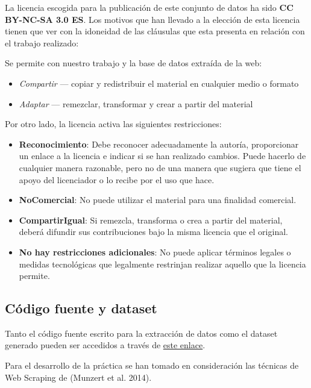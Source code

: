 \documentclass[]{article}
\providecommand{\tightlist}{%
  \setlength{\itemsep}{0pt}\setlength{\parskip}{0pt}}
\begin{document}
La licencia escogida para la publicación de este conjunto de datos ha
sido \textbf{CC BY-NC-SA 3.0 ES}. Los motivos que han llevado a la
elección de esta licencia tienen que ver con la idoneidad de las
cláusulas que esta presenta en relación con el trabajo realizado:

Se permite con nuestro trabajo y la base de datos extraída de la web:

\begin{itemize}
\tightlist
\item
  \emph{Compartir} --- copiar y redistribuir el material en cualquier
  medio o formato
\item
  \emph{Adaptar} --- remezclar, transformar y crear a partir del
  material
\end{itemize}

Por otro lado, la licencia activa las siguientes restricciones:

\begin{itemize}
\tightlist
\item
  \textbf{Reconocimiento}: Debe reconocer adecuadamente la autoría,
  proporcionar un enlace a la licencia e indicar si se han realizado
  cambios. Puede hacerlo de cualquier manera razonable, pero no de una
  manera que sugiera que tiene el apoyo del licenciador o lo recibe por
  el uso que hace.
\item
  \textbf{NoComercial}: No puede utilizar el material para una finalidad
  comercial.
\item
  \textbf{CompartirIgual}: Si remezcla, transforma o crea a partir del
  material, deberá difundir sus contribuciones bajo la misma licencia
  que el original.
\item
  \textbf{No hay restricciones adicionales}: No puede aplicar términos
  legales o medidas tecnológicas que legalmente restrinjan realizar
  aquello que la licencia permite.
\end{itemize}

\subsection{Código fuente y dataset}\label{codigo-fuente-y-dataset}

Tanto el código fuente escrito para la extracción de datos como el
dataset generado pueden ser accedidos a través de
\href{https://github.com/rgarciarui/videogamesScrapper}{este enlace}.

Para el desarrollo de la práctica se han tomado en consideración las
técnicas de Web Scraping de (Munzert et al. 2014).
\end{document}
